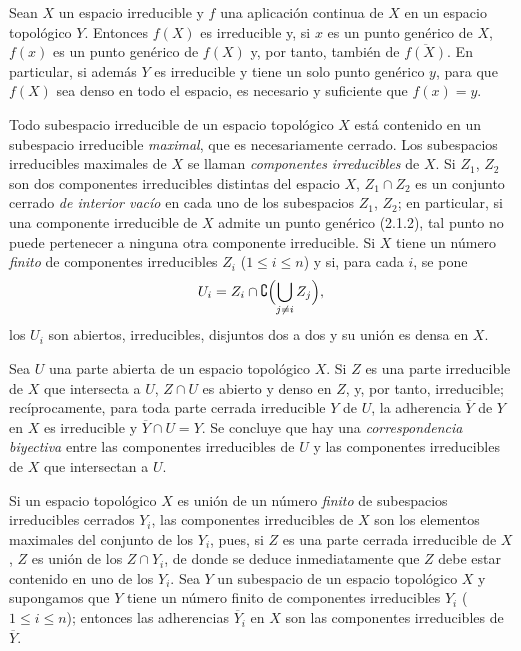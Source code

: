 
\begin{env}[2.1.5]
\label{0.2.1.5-fr}
Sean $X$ un espacio irreducible y $f$ una aplicación continua de $X$ en un
espacio topológico $Y$. Entonces $f(X)$ es irreducible y, si $x$ es un punto
genérico de $X$, $f(x)$ es un punto genérico de $f(X)$ y, por tanto, también de
$\overline{f(X)}$. En particular, si además $Y$ es irreducible y tiene un solo
punto genérico $y$, para que $f(X)$ sea denso en todo el espacio, es necesario y suficiente
que $f(x)=y$.
\end{env}

\begin{env}[2.1.6]
\label{0.2.1.6-fr}
Todo subespacio irreducible de un espacio topológico $X$ está contenido en un
subespacio irreducible \emph{maximal}, que es necesariamente cerrado. Los
subespacios irreducibles maximales de $X$ se llaman \emph{componentes
irreducibles} de $X$. Si $Z_1$, $Z_2$ son dos componentes irreducibles
distintas del espacio $X$, $Z_1\cap Z_2$ es un conjunto cerrado \emph{de interior vacío}
en cada uno de los subespacios $Z_1$, $Z_2$; en particular, si una componente
irreducible de $X$ admite un punto genérico (2.1.2), tal punto no puede
pertenecer a ninguna otra componente irreducible. Si $X$ tiene un número
\emph{finito} de componentes irreducibles $Z_i$ ($1\leq i\leq n$) y si, para
cada $i$, se pone
\[
  U_i=Z_i\cap\complement\Bigl(\bigcup_{j\neq i}Z_j\Bigr),
\]
los $U_i$ son abiertos, irreducibles, disjuntos dos a dos y su
unión es densa en $X$.

Sea $U$ una parte abierta de un espacio topológico $X$. Si $Z$ es una parte
irreducible de $X$ que intersecta a $U$, $Z\cap U$ es abierto y denso en $Z$,
y, por tanto, irreducible; recíprocamente, para toda parte cerrada irreducible $Y$ de
$U$, la adherencia $\overline Y$ de $Y$ en $X$ es irreducible y
$\overline Y\cap U=Y$. Se concluye que hay una \emph{correspondencia
biyectiva} entre las componentes irreducibles de $U$ y las componentes
irreducibles de $X$ que intersectan a $U$.
\end{env}

\begin{env}[2.1.7]
\label{0.2.1.7-fr}
Si un espacio topológico $X$ es unión de un número \emph{finito} de
subespacios irreducibles cerrados $Y_i$, las componentes irreducibles de $X$
son los elementos maximales del conjunto de los $Y_i$, pues, si $Z$ es una parte
cerrada irreducible de $X$, $Z$ es unión de los $Z\cap Y_i$, de donde se deduce
inmediatamente que $Z$ debe estar contenido en uno de los $Y_i$. Sea $Y$ un subespacio
de un espacio topológico $X$ y supongamos que $Y$ tiene un número finito de
componentes irreducibles $Y_i$ ($1\leq i\leq n$); entonces las adherencias
$\overline{Y}_i$ en $X$ son las componentes irreducibles de $\overline Y$.
\end{env}

